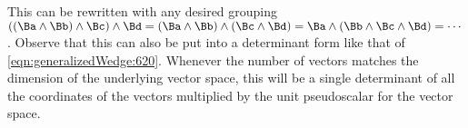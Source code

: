 This can be rewritten with any desired grouping \( ((\Ba \wedge \Bb) \wedge \Bc) \wedge \Bd = (\Ba \wedge \Bb) \wedge ( \Bc \wedge \Bd) = \Ba \wedge (\Bb \wedge \Bc \wedge \Bd) = \cdots \).
Observe that this can also be put into a determinant form like that of
\cref{eqn:generalizedWedge:620}.
Whenever the number of vectors matches the dimension of the underlying vector space, this will be a single determinant of all the coordinates of the vectors multiplied by the unit pseudoscalar for the vector space.

